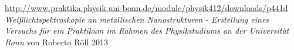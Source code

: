 \url{http://www.praktika.physik.uni-bonn.de/module/physik412/downloads/p441d}
\textit{Weißlichtspektroskopie an metallischen
Nanostrukturen - Erstellung eines Versuchs für ein Praktikum im Rahmen des
Physikstudiums an der Universität Bonn} von Roberto Röll 2013



